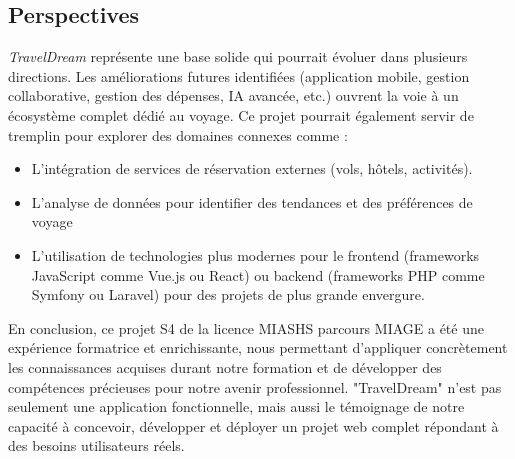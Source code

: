 \documentclass[a4paper,12pt]{article}
\begin{document}
\subsection{Perspectives}
\textit{TravelDream}  représente une base solide qui pourrait évoluer dans plusieurs directions. Les améliorations futures identifiées (application mobile, gestion collaborative, gestion des dépenses, IA avancée, etc.) ouvrent la voie à un écosystème complet dédié au voyage.
Ce projet pourrait également servir de tremplin pour explorer des domaines connexes
comme :
\begin{itemize}
    \item L'intégration de services de réservation externes (vols, hôtels, activités).
    \item L'analyse de données pour identifier des tendances et des préférences de voyage
    \item L'utilisation de technologies plus modernes pour le frontend (frameworks JavaScript comme Vue.js ou React) ou backend (frameworks PHP comme Symfony ou Laravel) pour des projets de plus grande envergure.
\end{itemize}
En conclusion, ce projet S4 de la licence MIASHS parcours MIAGE a été une expérience
formatrice et enrichissante, nous permettant d'appliquer concrètement les
connaissances acquises durant notre formation et de développer des compétences
précieuses pour notre avenir professionnel. "TravelDream" n'est pas seulement une
application fonctionnelle, mais aussi le témoignage de notre capacité à concevoir,
développer et déployer un projet web complet répondant à des besoins utilisateurs
réels.
\end{document}
